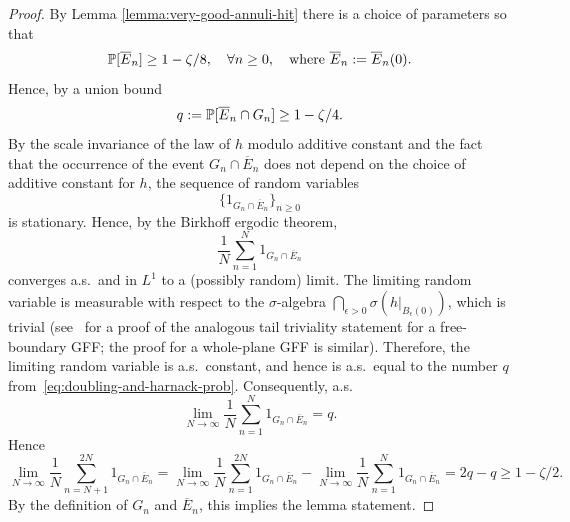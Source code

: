 \documentclass[12pt]{amsart}
\numberwithin{equation}{section}
\begin{document}
\begin{proof}
		By  Lemma \ref{lemma:very-good-annuli-hit} there is a choice of parameters so that 
		\begin{equation} \label{eq:harnack-prob}
		\P[\overline E_n] \geq 1 - \zeta /8 , \quad \forall n \geq 0 ,\quad \text{where $\overline E_n := \overline E_n(0)$} .
		\end{equation}
		Hence, by a union bound
		\begin{equation} \label{eq:doubling-and-harnack-prob}
		q := \P[\overline E_n \cap G_n] \geq 1- \zeta/4.
		\end{equation}
		By the scale invariance of the law of $h$ modulo additive constant and the fact that the occurrence of the event $G_n \cap \overline E_n$ does not depend on the choice of additive constant for $h$, the sequence of random variables
		\[
		\{1_{G_n \cap \overline E_n}\}_{n \geq 0}
		\]
		is stationary. 
		Hence, by the Birkhoff ergodic theorem, 
		\[
		\frac{1}{N} \sum_{n=1}^N  1_{G_n \cap \overline E_n}
		\]
		converges a.s.\ and in $L^1$ to a (possibly random) limit. The limiting random variable is measurable with respect to the $\sigma$-algebra $\bigcap_{\epsilon > 0} \sigma(h|_{B_\epsilon(0)})$, which is trivial (see~\cite[Lemma 7.2]{duplantier2014liouville} for a proof of the analogous tail triviality statement for a free-boundary GFF; the proof for a whole-plane GFF is similar). 
		Therefore, the limiting random variable is a.s.\ constant, and hence is a.s.\ equal to the number $q$ from~\eqref{eq:doubling-and-harnack-prob}. Consequently, a.s.\ 
		\begin{equation}
		\lim_{N \to \infty} \frac{1}{N} \sum_{n=1}^N  1_{G_n \cap \overline E_n} = q. 
		\end{equation}
		Hence
		\begin{equation}
		\lim_{N \to \infty} \frac{1}{N} \sum_{n=N+1}^{2N}  1_{G_n \cap \overline E_n}
		= \lim_{N \to\infty} \frac{1}{N} \sum_{n=1}^{2N}  1_{G_n \cap \overline E_n} - \lim_{N \to\infty} \frac{1}{N} \sum_{n=1}^{N}  1_{G_n \cap \overline E_n} 
		= 2q - q
		\geq 1-\zeta/2 .
		\end{equation}
		By the definition of $G_n$ and $\overline E_n$, this implies the lemma statement. 
	\end{proof}
	
	
	
\end{document}
